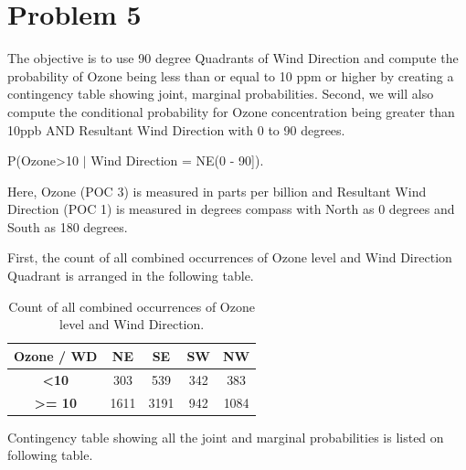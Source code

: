 \documentclass{article}%
\begin{document}
\section *{Problem 5}
The objective is to use 90 degree Quadrants of Wind Direction and compute the probability of Ozone being less than or
equal to 10 ppm or higher by creating a contingency table showing joint, marginal probabilities. Second, we will also compute the conditional probability for Ozone concentration being greater than 10ppb AND Resultant Wind Direction with 0 to 90 degrees. \\ \par 
\begin{center}
P(Ozone\textgreater 10 $|$ Wind Direction = NE(0 - 90]). \\ \par
\end{center}
Here, Ozone (POC 3) is measured in parts per billion and Resultant Wind Direction (POC 1) is measured in degrees compass with North as 0 degrees and South as 180 degrees. \\  \par

First, the count of all combined occurrences of Ozone level and Wind Direction Quadrant is arranged in the following table.

\begin{table}[H]
\begin{center}
\begin{tabular}{|c|c|c|c|c|}
\hline
\textbf{Ozone / WD}         & \textbf{NE} & \textbf{SE} & \textbf{SW} & \textbf{NW} \\ \hline
\textbf{\textless 10}       & 303         & 539         & 342         & 383         \\ \hline
\textbf{\textgreater{}= 10} & 1611        & 3191        & 942         & 1084        \\ \hline
\end{tabular}
\caption{\footnotesize Count of all combined occurrences of Ozone level and Wind Direction.}	
\end{center}
\end{table}

Contingency table showing all the joint and marginal probabilities is listed on following table.
\end{document}
